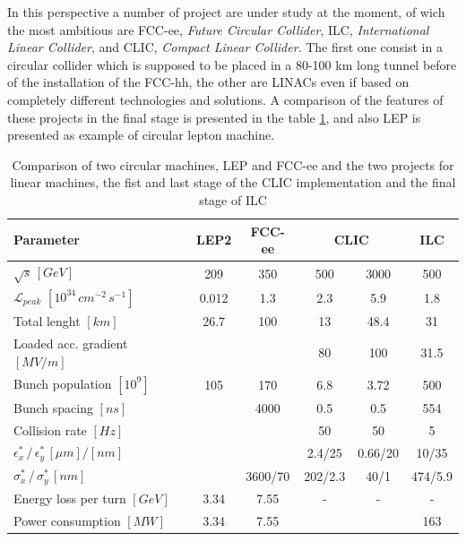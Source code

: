 In this perspective a number of project are under study at the moment, of wich the most ambitious are FCC-ee, \textit{Future Circular Collider}, ILC, \textit{International Linear Collider}, and CLIC, \textit{Compact Linear Collider}. The first one consist in a circular collider which is supposed to be placed in a 80-100 km long tunnel before of the installation of the FCC-hh, the other are LINACs even if based on completely different technologies and solutions.  A comparison of the features of these projects in the final stage is presented in the table \ref{table_CLIC_ILC_FCC}, and also LEP is presented as example of circular lepton machine.

\begin{table}
  \centering
    \begin{tabular}{ l c c | c c c }
    \hline
    \hline
    \textbf{Parameter}								& \textbf{LEP2}	&	\textbf{FCC-ee}	&  \multicolumn{2}{c}{\textbf{CLIC}}	&	\textbf{ILC}	\\
    \hline
    $\sqrt{s} \, [GeV]$				& 209	& 350  		&  	500	&  3000	& 500	\\
    $\mathscr{L}_{peak}$  $[10^{34} \, cm^{-2} \, s^{-1}]$	&0.012	& 1.3			&  	2.3	& 	5.9	&1.8		\\
    Total lenght $[km]$						&26.7	& 100		& 13		&  48.4	& 31		\\
    Loaded acc. gradient $[MV/m]$				&		& 			& 80		& 100 	& 31.5	\\
    Bunch population $[10^9]$					& 105	& 170  		&  6.8	& 	3.72	& 500	\\
    Bunch spacing $[ns]$						& 		& 4000	  	&  	0.5	& 	0.5	& 554	\\
    Collision rate $[Hz]$						&  		&  			&  	50	& 	50	& 5		\\
    $\epsilon^*_x \, / \, \epsilon^*_y \, [\mu m]/[nm]$	& 		&  		        &  2.4/25	& 0.66/20	& 10/35	\\  
    $\sigma^*_x\, / \, \sigma^*_y\, [nm]$			& 		&  	3600/70	&  202/2.3	& 40/1	&474/5.9	\\    
    Energy loss per turn $[GeV]$					&  3.34	& 	7.55		& - 		& -		& -		\\
    Power consumption $[MW]$					&  3.34	& 	7.55		& 		& 		& 163	\\
    \hline
    \hline
    \end{tabular}
  \caption{Comparison of two circular machines, LEP\cite{FCC-ee:leptonCollParam} and FCC-ee\cite{FCC-ee:leptonCollParam,Zimmermann:2057706} and the two projects for linear machines, the fist and last stage of the CLIC implementation \cite{CLIC:cdr} and the final stage of ILC\cite{ILC:tdr} }
\label{table_CLIC_ILC_FCC}
\end{table}



